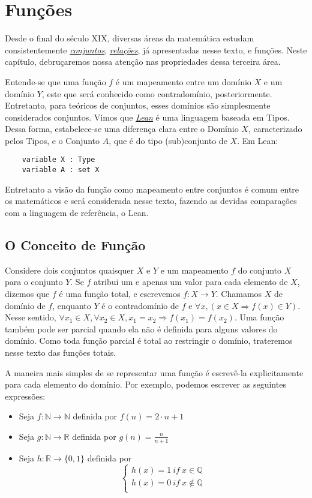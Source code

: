 \chapter{Funções}

Desde o final do século XIX, diversas áreas da matemática
estudam consistentemente \textit{\hyperlink{chapter.4}{conjuntos}},
\textit{\hyperlink{chapter.5}{relações}}, já apresentadas
nesse texto, e funções. Neste capítulo, debruçaremos nossa
atenção nas propriedades dessa terceira área.

Entende-se que uma função $f$ é um mapeamento entre um
domínio $X$ e um domínio $Y$, este que será conhecido como
contradomínio, posteriormente. Entretanto, para teóricos
de conjuntos, esses domínios são simplesmente considerados
conjuntos. Vimos que \textit{\hyperlink{chapter.2}{Lean}} é uma
linguagem baseada em Tipos. Dessa forma, estabelece-se uma
diferença clara entre o Domínio $X$, caracterizado pelos Tipos, e
o Conjunto $A$, que é do tipo (sub)conjunto de $X$. Em Lean:
\begin{lstlisting}
    variable X : Type
    variable A : set X
\end{lstlisting}

Entretanto a visão da função como mapeamento entre conjuntos
é comum entre os matemáticos e será considerada nesse texto,
fazendo as devidas comparações com a linguagem de referência,
o Lean.

\section{O Conceito de Função}

Considere dois conjuntos quaisquer $X$ e $Y$ e um mapeamento $f$
do conjunto $X$ para o conjunto $Y$. Se $f$ atribui um e apenas
um valor para cada elemento de $X$, dizemos que $f$ é uma função total, e
escrevemos $f: X \to Y$.  Chamamos $X$ de domínio de $f$, enquanto
$Y$ é o contradomínio de $f$ e $\forall x, (x \in X  \Rightarrow f(x) \in Y)$.
Nesse sentido, $\forall x_1 \in X, \forall x_2 \in X, x_1 = x_2 \Rightarrow f(x_1) = f(x_2)$.
Uma função também pode ser parcial quando ela não é definida para alguns valores
do domínio. Como toda função parcial é total ao restringir o domínio, trateremos
nesse texto das funções totais.

A maneira mais simples de se representar uma função é escrevê-la explicitamente
para cada elemento do domínio. Por exemplo, podemos escrever as seguintes expressões:

\begin{itemize}
    \item Seja $f: \mathbb{N} \to \mathbb{N}$ definida por
    $f(n) = 2\cdot n + 1$
    \item Seja $g : \mathbb{N} \to \mathbb{R}$ definida por
    $g(n) = \frac{n}{n+1}$
    \item Seja $h : \mathbb{R} \to \{0,1\}$ definida por
    $$\left \{ \begin{array}{c}
    h(x) = 1 ~if~x \in \mathbb{Q} \\
    h(x) = 0 ~ if ~ x \not \in \mathbb{Q} \\
    \end{array}
    \right. $$
 \end{itemize}

